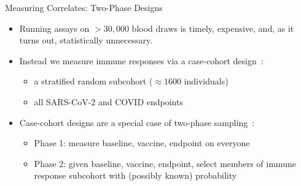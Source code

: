 \documentclass{beamer}
\begin{document}

\begin{frame}[c]{Measuring Correlates: Two-Phase Designs}

\begin{center}
\begin{itemize}
  \itemsep10pt
    \item Running assays on $>30,000$ blood draws is timely, expensive, and,
      as it turns out, statistically unnecessary.
    \item Instead we measure immune responses via a case-cohort
      design~\citep{prentice1986case}:
      \begin{itemize}
          \item a stratified random subcohort ($\approx 1600$ individuals)
          \item all SARS-CoV-2 and COVID endpoints
      \end{itemize}
    \item Case-cohort designs are a special case of two-phase
      sampling~\citep{breslow2003large,breslow2009improved}:
      \begin{itemize}
          \item Phase 1: measure baseline, vaccine, endpoint on everyone
          \item Phase 2: given baseline, vaccine, endpoint, select members of
            immune response subcohort with (possibly known) probability
      \end{itemize}
\end{itemize}
\end{center}

\note{
}

\end{frame}

\end{document}
